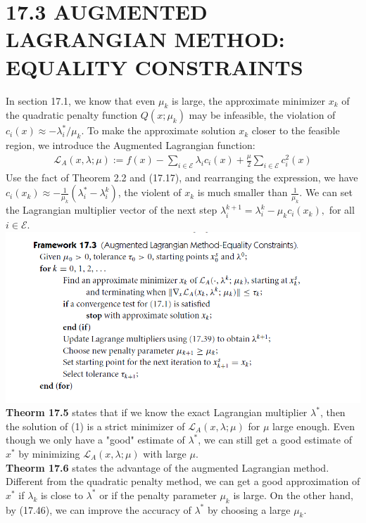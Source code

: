 \documentclass[11pt,a4paper]{article}
\renewcommand{\(}{\left(}
\renewcommand{\)}{\right)}
\begin{document}
\section*{17.3 AUGMENTED LAGRANGIAN METHOD: EQUALITY CONSTRAINTS}
In section 17.1, we know that even $\mu_{k}$ is large, the approximate minimizer $x_{k}$ of the quadratic penalty function $Q(x;\mu_{k})$ may be infeasible, the violation of $c_{i}(x)\approx-\lambda_{i}^{*}/\mu_{k}.$ To make the approximate solution $x_{k}$ closer to the feasible region, we introduce the Augmented Lagrangian function:
\begin{align}
\mathcal{L}_{A}(x,\lambda;\mu):=f(x)-\sum_{i\in\mathcal{E}}\lambda_{i}c_{i}(x)+\frac{\mu}{2}\sum_{i\in\mathcal{E}}c_{i}^{2}(x)
\end{align}
Use the fact of Theorem 2.2 and (17.17), and rearranging the expression, we have $c_{i}(x_{k})\approx-\frac{1}{\mu_{k}}(\lambda_{i}^{*}-\lambda_{i}^{k})$, the violent of $x_{k}$ is much smaller than $\frac{1}{\mu_{k}}$.  We can set the Lagrangian multiplier vector of the next step $\lambda_{i}^{k+1}=\lambda_{i}^{k}-\mu_{k}c_{i}(x_{k}),$ for all $ i\in \mathcal{E}$.\\
\includegraphics[scale=0.6]{fram17_3}\\
\textbf{Theorm 17.5} states that if we know the exact Lagrangian multiplier $\lambda^{*}$, then the solution of (1) is a strict minimizer of $\mathcal{L}_{A}(x,\lambda;\mu)$ for $\mu$ large enough. Even though we only have a "good" estimate of $\lambda^{*}$, we can still get  a good estimate of $x^{*}$ by minimizing  $\mathcal{L}_{A}(x,\lambda;\mu)$ with large $\mu$.\\
\textbf{Theorm 17.6} states the advantage of the augmented Lagrangian method. Different from the quadratic penalty method, we can get a good approximation of $x^{*}$ if $\lambda_{k}$ is close to $\lambda^{*}$ or if the penalty parameter $\mu_{k}$ is large. On the other hand, by (17.46), we can improve the accuracy of $\lambda^{*}$ by choosing a large $\mu_{k}$.\\
\end{document}
